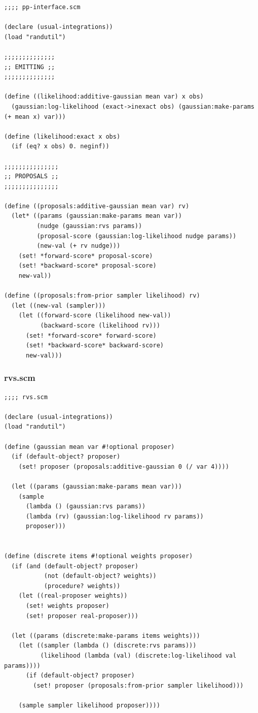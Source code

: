 \documentclass{article}
\begin{document}
\begin{verbatim}
;;;; pp-interface.scm

(declare (usual-integrations))
(load "randutil")

;;;;;;;;;;;;;;
;; EMITTING ;;
;;;;;;;;;;;;;;

(define ((likelihood:additive-gaussian mean var) x obs)
  (gaussian:log-likelihood (exact->inexact obs) (gaussian:make-params (+ mean x) var)))

(define (likelihood:exact x obs)
  (if (eq? x obs) 0. neginf))

;;;;;;;;;;;;;;;
;; PROPOSALS ;;
;;;;;;;;;;;;;;;

(define ((proposals:additive-gaussian mean var) rv)
  (let* ((params (gaussian:make-params mean var))
         (nudge (gaussian:rvs params))
         (proposal-score (gaussian:log-likelihood nudge params))
         (new-val (+ rv nudge)))
    (set! *forward-score* proposal-score)
    (set! *backward-score* proposal-score)
    new-val))

(define ((proposals:from-prior sampler likelihood) rv)
  (let ((new-val (sampler)))
    (let ((forward-score (likelihood new-val))
          (backward-score (likelihood rv)))
      (set! *forward-score* forward-score)
      (set! *backward-score* backward-score)
      new-val)))
\end{verbatim}

\subsubsection{rvs.scm}

\begin{verbatim}
;;;; rvs.scm

(declare (usual-integrations))
(load "randutil")

(define (gaussian mean var #!optional proposer)
  (if (default-object? proposer)
    (set! proposer (proposals:additive-gaussian 0 (/ var 4))))

  (let ((params (gaussian:make-params mean var)))
    (sample
      (lambda () (gaussian:rvs params))
      (lambda (rv) (gaussian:log-likelihood rv params))
      proposer)))


(define (discrete items #!optional weights proposer)
  (if (and (default-object? proposer)
           (not (default-object? weights))
           (procedure? weights))
    (let ((real-proposer weights))
      (set! weights proposer)
      (set! proposer real-proposer)))

  (let ((params (discrete:make-params items weights)))
    (let ((sampler (lambda () (discrete:rvs params)))
          (likelihood (lambda (val) (discrete:log-likelihood val params))))
      (if (default-object? proposer)
        (set! proposer (proposals:from-prior sampler likelihood)))

    (sample sampler likelihood proposer))))
\end{verbatim}
\end{document}
